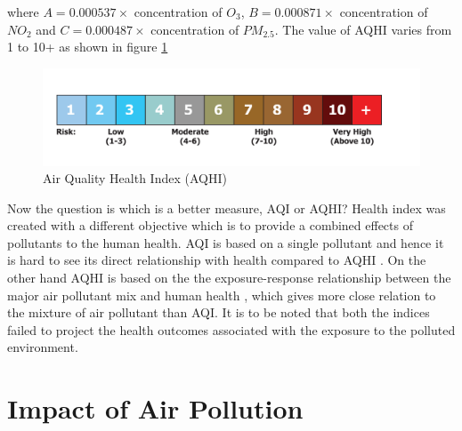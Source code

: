 where $ A = 0.000537 \times$ concentration of  $O_3$, $B = 0.000871 \times$ concentration  of $NO_2$ and  $C = 0.000487 \times$ concentration of $PM_{2.5}$.
The value of AQHI varies from 1 to 10+ as shown in figure \ref{aqhi}


\begin{figure}[h]
    \begin{center}
    \includegraphics[scale=0.58]{./images/figure12.png}
    \end{center}
   
    \caption{Air Quality Health Index (AQHI) \cite{healthcanada}}
    
    \label{aqhi}
\end{figure}

Now the question is which is a better measure, AQI or AQHI? Health index was created with a different objective which is to provide a combined effects of pollutants to the human health. AQI is based on a single pollutant and hence it is hard to see its direct relationship with health compared to AQHI \cite{Chen2013}. On the other hand AQHI is based on the  the exposure-response relationship between the major air pollutant mix and human health \cite{Chen2013}, which gives more close relation to the mixture of air pollutant than AQI. It is to be noted that both the indices failed to project the health outcomes associated with the exposure to the polluted environment.



\section{Impact of Air Pollution}

